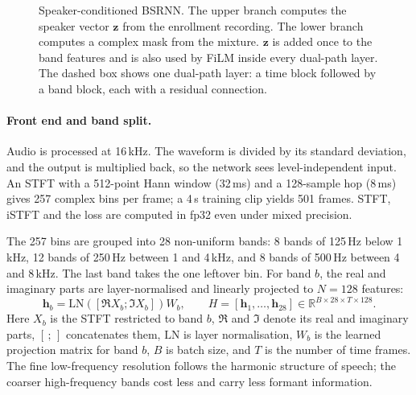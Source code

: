 \documentclass[11pt,a4paper]{article}
\begin{document}
\begin{figure}[t]
{%
}
\caption{Speaker-conditioned BSRNN. The upper branch computes the speaker vector
$\mathbf{z}$ from the enrollment recording. The lower branch computes a complex mask from the
mixture. $\mathbf{z}$ is added once to the band features and is also used by FiLM inside every
dual-path layer. The dashed box shows one dual-path layer: a time block followed by a band
block, each with a residual connection.}
\label{fig:arch}
\end{figure}

\paragraph{Front end and band split.}
Audio is processed at 16\,kHz. The waveform is divided by its standard deviation, and the output
is multiplied back, so the network sees level-independent input. An STFT with a 512-point Hann
window (32\,ms) and a 128-sample hop (8\,ms) gives 257 complex bins per frame; a 4\,s training clip
yields 501 frames. STFT, iSTFT and the loss are computed in fp32 even under mixed precision.

The 257 bins are grouped into 28 non-uniform bands: 8 bands of 125\,Hz below 1\,kHz, 12 bands of
250\,Hz between 1 and 4\,kHz, and 8 bands of 500\,Hz between 4 and 8\,kHz. The last band takes the
one leftover bin. For band $b$, the real and imaginary parts are layer-normalised and linearly
projected to $N=128$ features:
\begin{equation}
  \mathbf{h}_b=\mathrm{LN}\!\left(\left[\Re X_b;\Im X_b\right]\right)W_b,
  \qquad
  H=[\mathbf{h}_1,\ldots,\mathbf{h}_{28}]\in\mathbb{R}^{B\times28\times T\times128}.
\end{equation}
Here $X_b$ is the STFT restricted to band $b$, $\Re$ and $\Im$ denote its real and imaginary
parts, $[\,;\,]$ concatenates them, $\mathrm{LN}$ is layer normalisation, $W_b$ is the learned
projection matrix for band $b$, $B$ is batch size, and $T$ is the number of time frames.
The fine low-frequency resolution follows the harmonic structure of speech; the coarser
high-frequency bands cost less and carry less formant information.
\end{document}
